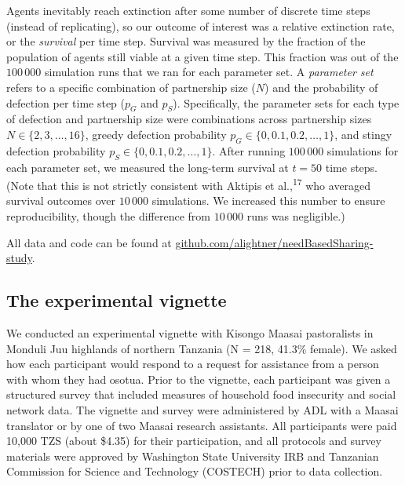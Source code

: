 \documentclass[
]{article}
\begin{document}
Agents inevitably reach extinction after some number of discrete time steps (instead of replicating), so our outcome of interest was a relative extinction rate, or the \emph{survival} per time step. Survival was measured by the fraction of the population of agents still viable at a given time step. This fraction was out of the \(100\,000\) simulation runs that we ran for each parameter set. A \emph{parameter set} refers to a specific combination of partnership size (\(N\)) and the probability of defection per time step (\(p_G\) and \(p_S\)). Specifically, the parameter sets for each type of defection and partnership size were combinations across partnership sizes \(N \in \{ 2, 3, \dots, 16 \}\), greedy defection probability \(p_G \in \{0, 0.1, 0.2, \dots, 1\}\), and stingy defection probability \(p_S \in \{0, 0.1, 0.2, \dots, 1\}\). After running \(100\,000\) simulations for each parameter set, we measured the long-term survival at \(t=50\) time steps. (Note that this is not strictly consistent with Aktipis et al.,\textsuperscript{17} who averaged survival outcomes over \(10\,000\) simulations. We increased this number to ensure reproducibility, though the difference from \(10\,000\) runs was negligible.)

All data and code can be found at \href{https://github.com/alightner/needBasedSharing-study}{github.com/alightner/needBasedSharing-study}.

\subsection*{The experimental vignette}\label{experimentmethods}

We conducted an experimental vignette with Kisongo Maasai pastoralists in Monduli Juu highlands of northern Tanzania (N = 218, 41.3\% female). We asked how each participant would respond to a request for assistance from a person with whom they had osotua. Prior to the vignette, each participant was given a structured survey that included measures of household food insecurity and social network data. The vignette and survey were administered by ADL with a Maasai translator or by one of two Maasai research assistants. All participants were paid 10,000 TZS (about \$4.35) for their participation, and all protocols and survey materials were approved by Washington State University IRB and Tanzanian Commission for Science and Technology (COSTECH) prior to data collection.
\end{document}
